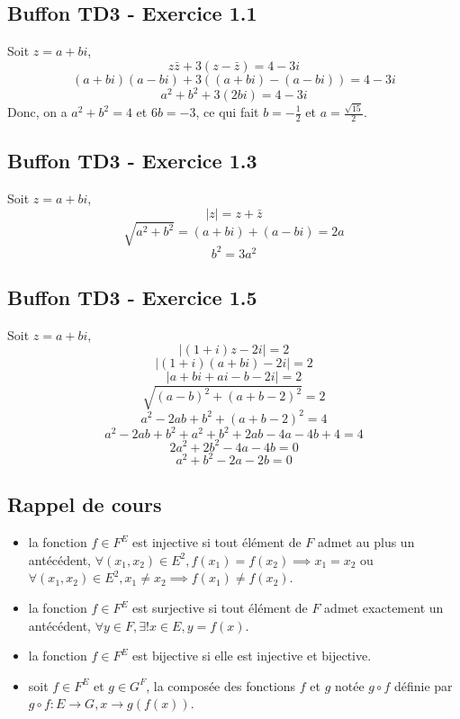 \documentclass[]{book}
\theoremstyle{definition}
\begin{document}
\newpage
\subsection*{Buffon TD3 - Exercice 1.1}
Soit $z=a+bi$,
$$z\bar{z} + 3(z-\bar{z}) = 4 -3i$$
$$(a+bi)(a-bi) + 3((a+bi)-(a-bi)) = 4 -3i$$
$$ a^2+b^2 + 3(2bi) = 4 -3i$$
Donc, on a $a^2+b^2 =4$ et $6b = -3$, ce qui fait $b=-\frac{1}{2}$ et $a=\frac{\sqrt{15}}{2}$.

\subsection*{Buffon TD3 - Exercice 1.3}
Soit $z=a+bi$,
$$|z| = z + \bar{z}$$
$$\sqrt{a^2+b^2} = (a+bi)+(a-bi) = 2a$$
$$b^2 = 3a^2$$

\subsection*{Buffon TD3 - Exercice 1.5}
Soit $z=a+bi$,
$$|(1+i)z-2i| = 2$$
$$|(1+i)(a+bi)-2i| = 2$$
$$|a+bi+ai-b-2i| = 2$$
$$\sqrt{(a-b)^2+(a+b-2)^2} = 2$$
$$a^2-2ab+b^2 +(a+b-2)^2 = 4$$
$$a^2-2ab+b^2 + a^2+b^2+2ab-4a-4b+4 = 4$$
$$2a^2+2b^2 -4a-4b = 0$$
$$a^2+b^2 -2a-2b = 0$$


\newpage
\subsection*{Rappel de cours}	
\begin{itemize}
\item la fonction $f \in F^{E}$ est injective si tout \'el\'ement de $F$ admet au plus un ant\'ec\'edent, $\forall (x_1, x_2) \in E^2, f(x_1) = f(x_2) \implies x_1 = x_2$ ou $\forall (x_1, x_2) \in E^2, x_1 \neq x_2 \implies f(x_1) \neq f(x_2)$.
\item la fonction $f \in F^{E}$ est surjective si tout \'el\'ement de $F$ admet exactement un ant\'ec\'edent, $\forall y \in F, \exists !x \in E, y = f(x)$.
\item la fonction $f \in F^{E}$ est bijective si elle est injective et bijective.
\item soit $f \in F^{E}$ et $g \in G^{F}$, la compos\'ee des fonctions $f$ et $g$ not\'ee $g \circ f$ d\'efinie par $g \circ f : E \to G, x \to g(f(x))$.
\end{itemize}
\end{document}
